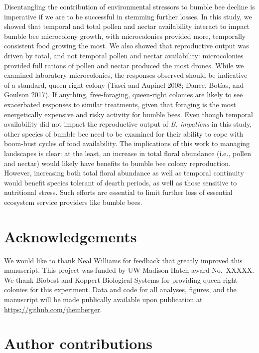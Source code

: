 \documentclass[11pt,]{article}
\begin{document}
Disentangling the contribution of environmental stressors to bumble bee
decline is imperative if we are to be successful in stemming further
losses. In this study, we showed that temporal and total pollen and
nectar availability interact to impact bumble bee microcolony growth,
with microcolonies provided more, temporally consistent food growing the
most. We also showed that reproductive output was driven by total, and
not temporal pollen and nectar availability: microcolonies provided full
rations of pollen and nectar produced the most drones. While we examined
laboratory microcolonies, the responses observed should be indicative of
a standard, queen-right colony (Tasei and Aupinel 2008; Dance, Botías,
and Goulson 2017). If anything, free-foraging, queen-right colonies are
likely to see exacerbated responses to similar treatments, given that
foraging is the most energetically expensive and risky activity for
bumble bees. Even though temporal availability did not impact the
reproductive output of \emph{B. impatiens} in this study, other species
of bumble bee need to be examined for their ability to cope with
boom-bust cycles of food availability. The implications of this work to
managing landscapes is clear: at the least, an increase in total floral
abundance (i.e., pollen and nectar) would likely have benefits to bumble
bee colony reproduction. However, increasing both total floral abundance
as well as temporal continuity would benefit species tolerant of dearth
periods, as well as those sensitive to nutritional stress. Such efforts
are essential to limit further loss of essential ecosystem service
providers like bumble bees.

\hypertarget{acknowledgements}{%
\section{Acknowledgements}\label{acknowledgements}}

We would like to thank Neal Williams for feedback that greatly improved
this manuscript. This project was funded by UW Madison Hatch award
No.~XXXXX. We thank Biobest and Koppert Biological Systems for providing
queen-right colonies for this experiment. Data and code for all
analyses, figures, and the manuscript will be made publically available
upon publication at \url{https://github.com/jhemberger}.

\hypertarget{author-contributions}{%
\section{Author contributions}\label{author-contributions}}
\end{document}
